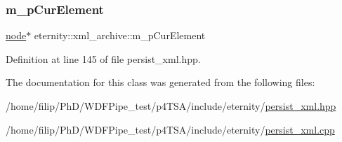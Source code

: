 \subsubsection{\texorpdfstring{m\+\_\+p\+Cur\+Element}{m\_pCurElement}}
{\footnotesize\ttfamily \hyperlink{classeternity_1_1node}{node}$\ast$ eternity\+::xml\+\_\+archive\+::m\+\_\+p\+Cur\+Element\hspace{0.3cm}{\ttfamily [protected]}}



Definition at line 145 of file persist\+\_\+xml.\+hpp.



The documentation for this class was generated from the following files\+:\begin{DoxyCompactItemize}
\item 
/home/filip/\+Ph\+D/\+W\+D\+F\+Pipe\+\_\+test/p4\+T\+S\+A/include/eternity/\hyperlink{persist__xml_8hpp}{persist\+\_\+xml.\+hpp}\item 
/home/filip/\+Ph\+D/\+W\+D\+F\+Pipe\+\_\+test/p4\+T\+S\+A/include/eternity/\hyperlink{persist__xml_8cpp}{persist\+\_\+xml.\+cpp}\end{DoxyCompactItemize}
